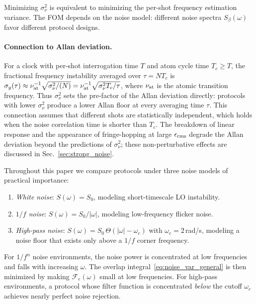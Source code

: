 \documentclass[aps,pra,twocolumn,superscriptaddress,longbibliography]{revtex4-2}
\begin{document}
Minimizing $\sigma^2_\nu$ is equivalent to minimizing the per-shot frequency
estimation variance.
The FOM depends on the noise model: different noise spectra $S_\beta(\omega)$
favor different protocol designs.

\paragraph{Connection to Allan deviation.}
For a clock with per-shot interrogation time $T$ and atom cycle time $T_c \geq T$,
the fractional frequency instability averaged over $\tau = N T_c$ is
$\sigma_y(\tau) \approx \nu_{\rm at}^{-1}\sqrt{\sigma^2_\nu/(N)} = \nu_{\rm at}^{-1}\sqrt{\sigma^2_\nu T_c/\tau}$,
where $\nu_{\rm at}$ is the atomic transition frequency.
Thus $\sigma^2_\nu$ sets the pre-factor of the Allan deviation directly:
protocols with lower $\sigma^2_\nu$ produce a lower Allan floor at every averaging
time $\tau$.
This connection assumes that different shots are statistically independent, which
holds when the noise correlation time is shorter than $T_c$.
The breakdown of linear response and the appearance of fringe-hopping at large
$\epsilon_{\rm rms}$ degrade the Allan deviation beyond the predictions of
$\sigma^2_\nu$; these non-perturbative effects are discussed in
Sec.~\ref{sec:strong_noise}.

Throughout this paper we compare protocols under three noise models of practical importance:
\begin{enumerate}
  \item \emph{White noise}: $S(\omega) = S_0$, modeling short-timescale LO instability.
  \item \emph{$1/f$ noise}: $S(\omega) = S_0/|\omega|$, modeling low-frequency flicker noise.
  \item \emph{High-pass noise}: $S(\omega) = S_0\,\Theta(|\omega| - \omega_c)$ with
        $\omega_c = 2$\,rad/s, modeling a noise floor that exists only above a $1/f$ corner
        frequency.
\end{enumerate}
For $1/f^\alpha$ noise environments, the noise power is concentrated at low frequencies and
falls with increasing $\omega$.  The overlap integral~\eqref{eq:noise_var_general} is then
minimized by making $\mathcal{F}_e(\omega)$ small at low frequencies.
For high-pass environments, a protocol whose filter function is concentrated \emph{below}
the cutoff $\omega_c$ achieves nearly perfect noise rejection.
\end{document}

